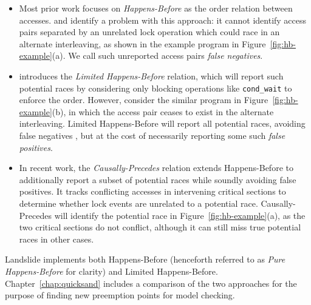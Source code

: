 \begin{itemize}
	\item Most prior work focuses on {\em Happens-Before} \cite{lamport-clocks} as the order relation between accesses.
\cite{predictive-dr} and \cite{hybriddatarace} identify a problem with this approach:
it cannot identify access pairs separated by an unrelated lock operation which could race in an alternate interleaving,
as shown in the example program in Figure~\ref{fig:hb-example}(a).
We call such unreported access pairs {\em false negatives}.

\item
\cite{hybriddatarace} introduces the {\em Limited Happens-Before} relation,
which will report such potential races
by considering only blocking operations like {\tt cond\_wait} to enforce the order.
However, consider the similar program in Figure~\ref{fig:hb-example}(b),
in which the access pair ceases to exist in the alternate interleaving.
Limited Happens-Before will report all potential races, avoiding false negatives \cite{tsan},
but at the cost of necessarily reporting some such {\em false positives}.

\item
In recent work, the {\em Causally-Precedes} relation \cite{predictive-dr} %
extends Happens-Before to additionally report a subset of potential races while soundly avoiding false positives.
It tracks conflicting accesses in intervening
critical sections to determine whether lock events are unrelated to a potential race.
Causally-Precedes will identify the potential race in Figure~\ref{fig:hb-example}(a), as the two critical sections do not conflict,
although it can still miss true potential races in other cases.
\end{itemize}

Landslide implements both Happens-Before (henceforth referred to as {\em Pure Happens-Before} for clarity) and Limited Happens-Before.
Chapter~\ref{chap:quicksand} includes a comparison of the two approaches for the purpose of finding new preemption points for model checking.


